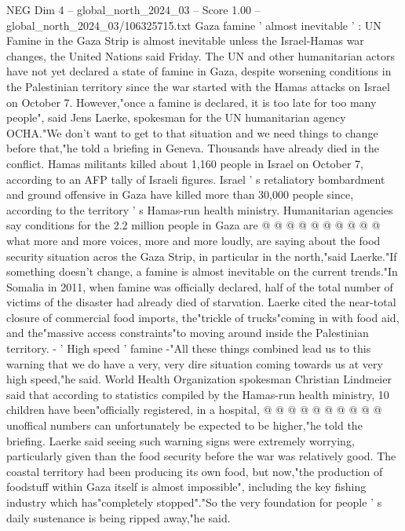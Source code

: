 \begin{textsample}{NEG Dim 4 – global\_north\_2024\_03 – Score 1.00 – global\_north\_2024\_03/106325715.txt}  \label{ex:f4_neg_230}
Gaza famine ' almost inevitable ' : UN Famine in the Gaza Strip is almost inevitable unless the Israel-Hamas war changes, the United Nations said Friday.
The UN and other humanitarian actors have not yet declared a state of famine in Gaza, despite worsening conditions in the Palestinian territory since the war started with the Hamas attacks on Israel on October 7.
However,"once a famine is declared, it is too late for too many people", said Jens Laerke, spokesman for the UN humanitarian agency OCHA."We don't want to get to that situation and we need things to change before that,"he told a briefing in Geneva.
Thousands have already died in the conflict.
Hamas militants killed about 1,160 people in Israel on October 7, according to an AFP tally of Israeli figures.
Israel ' s retaliatory bombardment and ground offensive in Gaza have killed more than 30,000 people since, according to the territory ' s Hamas-run health ministry.
Humanitarian agencies say conditions for the 2.2 million people in Gaza are @ @ @ @ @ @ @ @ @ @ what more and more voices, more and more loudly, are saying about the food security situation acros the Gaza Strip, in particular in the north,"said Laerke."If something doesn't change, a famine is almost inevitable on the current trends."In Somalia in 2011, when famine was officially declared, half of the total number of victims of the disaster had already died of starvation.
Laerke cited the near-total closure of commercial food imports, the"trickle of trucks"coming in with food aid, and the"massive access constraints"to moving around inside the Palestinian territory. - ' High speed ' famine -"All these things combined lead us to this warning that we do have a very, very dire situation coming towards us at very high speed,"he said.
World Health Organization spokesman Christian Lindmeier said that according to statistics compiled by the Hamas-run health ministry, 10 children have been"officially registered, in a hospital, @ @ @ @ @ @ @ @ @ @ unoffical numbers can unfortunately be expected to be higher,"he told the briefing.
Laerke said seeing such warning signs were extremely worrying, particularly given than the food security before the war was relatively good.
The coastal territory had been producing its own food, but now,"the production of foodstuff within Gaza itself is almost impossible", including the key fishing industry which has"completely stopped"."So the very foundation for people ' s daily sustenance is being ripped away,"he said.

\end{textsample}

